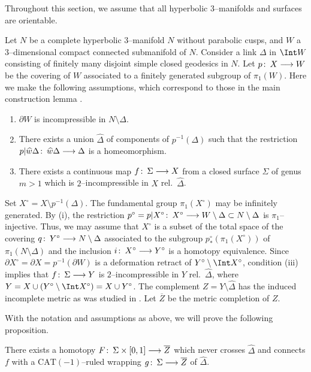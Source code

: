 \documentclass{gtart_a}
\theoremstyle{definition}
\numberwithin{equation}{section}
\begin{document}
Throughout this section, we assume that all hyperbolic $3$--manifolds and surfaces are orientable.

Let $N$ be a complete hyperbolic $3$--manifold $N$ without parabolic cusps, and $W$ a $3$--dimensional compact connected 
submanifold of $N$.
Consider a link $\Delta$ in $\Int W$ consisting of finitely many disjoint simple closed geodesics in $N$.
Let $p\mskip0.5mu\colon\thinspace X\longrightarrow W$ be the covering of $W$ associated to a finitely generated subgroup of $\pi_1(W)$.
Here we make the following assumptions, which correspond to those in the main construction lemma \cite[Lemma 2.3]{cg}.
\begin{enumerate}[\rm (i)]
\item
$\partial W$ is incompressible in $N\setminus \Delta$.
\item
There exists a union $\hat \Delta$ of components of $p^{-1}(\Delta)$ such that the restriction $p|\hat \Delta\co 
\hat \Delta\longrightarrow \Delta$ is a homeomorphism.
\item
There exists a continuous map $f\mskip0.5mu\colon\thinspace \Sigma\longrightarrow X$ from a closed surface $\Sigma$ of genus $m >1$ which 
is $2$--incompressible in $X$ rel.\ $\hat \Delta$.
\end{enumerate}

Set $X^\circ =X\setminus p^{-1}(\Delta)$.
The fundamental group $\pi_1(X^\circ)$ may be infinitely generated.
By (i), the restriction $p^\circ =p|X^\circ\mskip0.5mu\colon\thinspace X^\circ\longrightarrow W\setminus \Delta\subset N\setminus \Delta$ 
is $\pi_1$--injective.
Thus, we may assume that $X^\circ$ is a subset of the total space of the covering $q\mskip0.5mu\colon\thinspace Y^\circ \longrightarrow N
\setminus \Delta$ associated to the subgroup $p^\circ_*(\pi_1(X^\circ))$ of $\pi_1(N\setminus \Delta)$ and the 
inclusion $i\mskip0.5mu\colon\thinspace X^\circ\longrightarrow Y^\circ$ is a homotopy equivalence.
Since $\partial X^\circ=\partial X=p^{-1}(\partial W)$ is a deformation retract of $Y^\circ \setminus 
\Int X^\circ$, condition (iii) implies that $f\mskip0.5mu\colon\thinspace \Sigma\longrightarrow Y$ is $2$--incompressible in 
$Y$ rel.\ $\hat \Delta$, where $Y=X\cup (Y^\circ \setminus \Int X^\circ)=X\cup Y^\circ$.
The complement $Z=Y\setminus \hat \Delta$ has the induced incomplete metric as was studied in .
Let $\overline Z$ be the metric completion of $Z$.





With the notation and assumptions as above, we will prove the following proposition.


\begin{prop}\label{p_1}
There exists a homotopy $F\mskip0.5mu\colon\thinspace \Sigma\times [0,1]\longrightarrow \overline Z$ which never crosses $\hat \Delta$ and 
connects $f$ with a $\mathrm{CAT}(-1)$--ruled wrapping $g\mskip0.5mu\colon\thinspace \Sigma\longrightarrow \overline Z$ of $\hat \Delta$.
\end{prop}
\end{document}
